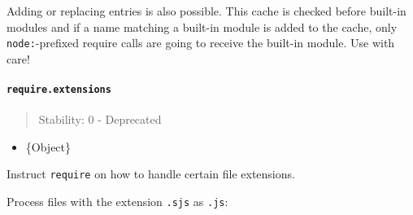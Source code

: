 Adding or replacing entries is also possible. This cache is checked
before built-in modules and if a name matching a built-in module is
added to the cache, only \texttt{node:}-prefixed require calls are going
to receive the built-in module. Use with care!

\begin{Shaded}
\begin{Highlighting}[]
\OperatorTok{=} \NormalTok{(}\NormalTok{)}\OperatorTok{;}
\OperatorTok{=} \NormalTok{(}\NormalTok{)}\OperatorTok{;}

\OperatorTok{=}\NormalTok{ \{\}}\OperatorTok{;}
 \OperatorTok{=}\NormalTok{ \{ }\OperatorTok{:}\OperatorTok{;}

\NormalTok{(}\NormalTok{(}\NormalTok{)}\OperatorTok{,}\OperatorTok{;}
\NormalTok{(}\NormalTok{(}\NormalTok{)}\OperatorTok{,}\OperatorTok{;}
\end{Highlighting}
\end{Shaded}

\paragraph{\texorpdfstring{\texttt{require.extensions}}{require.extensions}}\label{require.extensions}

\begin{quote}
Stability: 0 - Deprecated
\end{quote}

\begin{itemize}
\tightlist
\item
  \{Object\}
\end{itemize}

Instruct \texttt{require} on how to handle certain file extensions.

Process files with the extension \texttt{.sjs} as \texttt{.js}:

